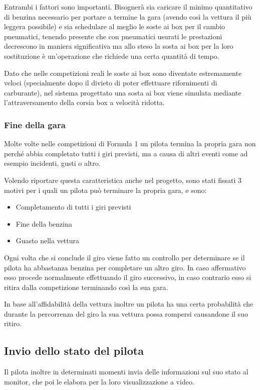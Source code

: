 \documentclass[a4paper,11pt, twoside, openright]{book}
\begin{document}
	  Entrambi i fattori sono importanti. Bisognerà sia caricare il minimo quantitativo di benzina necessario per
	  portare a termine la gara (avendo così la vettura il più leggera possibile) e sia
	  schedulare al meglio le soste ai box per il cambio pneumatici, tenendo presente che con pneumatici usurati le prestazioni
	  decrescono in maniera significativa ma allo steso la sosta ai box per la loro sostituzione è un'operazione
	  che richiede una certa quantità di tempo.
	  
	  Dato che nelle competizioni reali le soste ai box sono diventate estremamente veloci (specialmente dopo il divieto di poter
	  effettuare rifornimenti di carburante),
	  nel sistema progettato una sosta ai box viene simulata mediante l'attraversamento della corsia box a velocità ridotta.
	  
	\subsubsection{Fine della gara}
	  Molte volte nelle competizioni di Formula 1 un pilota termina la propria gara non perché
	  abbia completato tutti i giri previsti, ma a causa di altri eventi come ad esempio incidenti,
	  gusti o altro.
	  
	  Volendo riportare questa caratteristica anche nel progetto, sono stati fissati 3 motivi per i quali un 
	  pilota può terminare la propria gara, e sono:
	  
	  \begin{itemize}
	   \item Completamento di tutti i giri previsti
	   \item Fine della benzina
	   \item Guasto nella vettura
	  \end{itemize}
	  
	  Ogni volta che si conclude il giro viene fatto un controllo per determinare se il pilota
	  ha abbastanza benzina per completare un altro giro. In caso affermativo esso procede normalmente
	  effettuando il giro successivo, in caso contrario esso si ritira dalla competizione terminando così la sua gara.
	  
	  In base all'affidabilità della vettura inoltre un pilota ha una certa probabilità che durante la percorrenza del giro
	  la sua vettura possa rompersi causandone il suo ritiro.
	
      \subsection{Invio dello stato del pilota}
	Il pilota inoltre in determinati momenti invia delle informazioni sul suo stato al monitor, 
	che poi le elabora per la loro visualizzazione a video.
	
\end{document}
